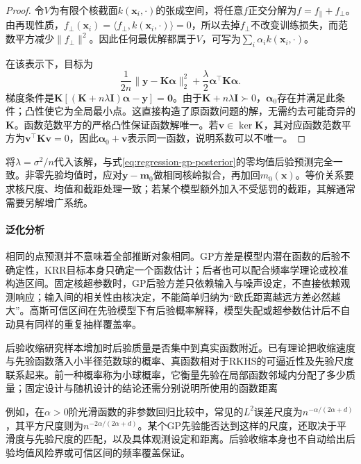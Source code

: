 \begin{proof}
令$V$为有限个核截面$k(\bm{x}_i,\cdot)$的张成空间，将任意$f$正交分解为$f=f_{\parallel}+f_{\perp}$。由再现性质，$f_{\perp}(\bm{x}_i)=\langle f_{\perp},k(\bm{x}_i,\cdot)\rangle=0$，所以去掉$f_{\perp}$不改变训练损失，而范数平方减少$\lVert f_{\perp}\rVert^2$。因此任何最优解都属于$V$，可写为$\sum_i\alpha_i k(\bm{x}_i,\cdot)$。

在该表示下，目标为
\[
  \frac1{2n}\lVert\bm{y}-\bm{K}\bm{\alpha}\rVert_2^2
       +\frac{\lambda}{2}\bm{\alpha}^{\top}\bm{K}\bm{\alpha}.
\]
梯度条件是$\bm{K}[(\bm{K}+n\lambda\bm{I})\bm{\alpha}-\bm{y}]=\bm{0}$。由于$\bm{K}+n\lambda\bm{I}\succ0$，$\bm{\alpha}_0$存在并满足此条件；凸性使它为全局最小点。这直接构造了原函数问题的解，无需约去可能奇异的$\bm{K}$。函数范数平方的严格凸性保证函数解唯一。若$\bm{v}\in\ker\bm{K}$，其对应函数范数平方为$\bm{v}^{\top}\bm{K}\bm{v}=0$，因此$\bm{\alpha}_0+\bm{v}$表示同一函数，说明系数可以不唯一。
\end{proof}

将$\lambda=\sigma^2/n$代入该解，与式\eqref{eq:regression-gp-posterior}的零均值后验预测完全一致。非零先验均值时，应对$\bm{y}-\bm{m}_0$做相同核岭拟合，再加回$m_0(\bm{x})$。等价关系要求核尺度、均值和截距处理一致；若某个模型额外加入不受惩罚的截距，其解通常需要另解增广系统。

\paragraph{泛化分析}
相同的点预测并不意味着全部推断对象相同。GP方差是模型内潜在函数的后验不确定性，KRR目标本身只确定一个函数估计；后者也可以配合频率学理论或校准构造区间。固定核超参数时，GP后验方差只依赖输入与噪声设定，不直接依赖观测响应；输入间的相关性由核决定，不能简单归纳为“欧氏距离越远方差必然越大”。高斯可信区间在先验模型下有后验概率解释，模型失配或超参数估计后不自动具有同样的重复抽样覆盖率。

后验收缩研究样本增加时后验质量是否集中到真实函数附近。已有理论把收缩速度与先验函数落入小半径范数球的概率、真函数相对于RKHS的可逼近性及先验尺度联系起来。前一种概率称为小球概率，它衡量先验在局部函数邻域内分配了多少质量；固定设计与随机设计的结论还需分别说明所使用的函数距离

例如，在$\alpha>0$阶光滑函数的非参数回归比较中，常见的$L^2$误差尺度为$n^{-\alpha/(2\alpha+d)}$，其平方尺度则为$n^{-2\alpha/(2\alpha+d)}$。某个GP先验能否达到这样的尺度，还取决于平滑度与先验尺度的匹配，以及具体观测设定和距离。后验收缩本身也不自动给出后验均值风险界或可信区间的频率覆盖保证。

